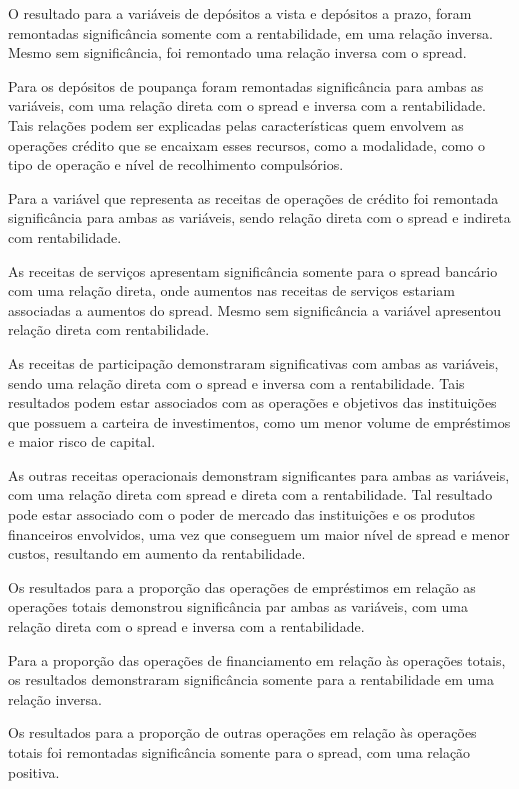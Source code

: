 \documentclass[
  12pt,
  12pt,
  openright,
  oneside,
  a4paper,
  chapter=TITLE,
  section=TITLE,
  subsection=TITLE,
  subsubsection=TITLE,
  english,
  portugues,
  sumario=tradicional]{abntex2}
\begin{document}
O resultado para a variáveis de depósitos a vista e depósitos a prazo, foram remontadas significância somente com a rentabilidade, em uma relação inversa. Mesmo sem significância, foi remontado uma relação inversa com o spread.

Para os depósitos de poupança foram remontadas significância para ambas as variáveis, com uma relação direta com o spread e inversa com a rentabilidade. Tais relações podem ser explicadas pelas características quem envolvem as operações crédito que se encaixam esses recursos, como a modalidade, como o tipo de operação e nível de recolhimento compulsórios.

Para a variável que representa as receitas de operações de crédito foi remontada significância para ambas as variáveis, sendo relação direta com o spread e indireta com rentabilidade.

As receitas de serviços apresentam significância somente para o spread bancário com uma relação direta, onde aumentos nas receitas de serviços estariam associadas a aumentos do spread. Mesmo sem significância a variável apresentou relação direta com rentabilidade.

As receitas de participação demonstraram significativas com ambas as variáveis, sendo uma relação direta com o spread e inversa com a rentabilidade. Tais resultados podem estar associados com as operações e objetivos das instituições que possuem a carteira de investimentos, como um menor volume de empréstimos e maior risco de capital.

As outras receitas operacionais demonstram significantes para ambas as variáveis, com uma relação direta com spread e direta com a rentabilidade. Tal resultado pode estar associado com o poder de mercado das instituições e os produtos financeiros envolvidos, uma vez que conseguem um maior nível de spread e menor custos, resultando em aumento da rentabilidade.

Os resultados para a proporção das operações de empréstimos em relação as operações totais demonstrou significância par ambas as variáveis, com uma relação direta com o spread e inversa com a rentabilidade.

Para a proporção das operações de financiamento em relação às operações totais, os resultados demonstraram significância somente para a rentabilidade em uma relação inversa.

Os resultados para a proporção de outras operações em relação às operações totais foi remontadas significância somente para o spread, com uma relação positiva.
\end{document}
